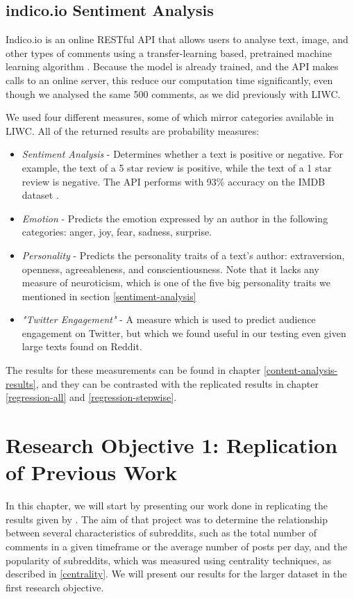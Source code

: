 \documentclass[bsc,frontabs,twoside,singlespacing,parskip,deptreport]{infthesis}
\begin{document}
\section{indico.io Sentiment Analysis}\label{indico}

Indico.io is an online RESTful API that allows users to analyse text, image, and other types of comments using a transfer-learning based, pretrained machine learning algorithm \cite{indico}. Because the model is already trained, and the API makes calls to an online server, this reduce our computation time significantly, even though we analysed the same 500 comments, as we did previously with LIWC.

We used four different measures, some of which mirror categories available in LIWC. All of the returned results are probability measures:

\begin{itemize}
	\item \textit{Sentiment Analysis} - Determines whether a text is positive or negative. For example, the text of a 5 star review is positive, while the text of a 1 star review is negative. The API performs with 93\% accuracy on the IMDB dataset \cite{indico}.
	\item \textit{Emotion} - Predicts the emotion expressed by an author in the following categories: anger, joy, fear, sadness, surprise.
	\item \textit{Personality} - Predicts the personality traits of a text's author: extraversion, openness, agreeableness, and conscientiousness. Note that it lacks any measure of neuroticism, which is one of the five big personality traits we mentioned in section \ref{sentiment-analysis}
	\item \textit{"Twitter Engagement"} - A measure which is used to predict audience engagement on Twitter, but which we found useful in our testing even given large texts found on Reddit.
\end{itemize}

The results for these measurements can be found in chapter \ref{content-analysis-results}, and they can be contrasted with the replicated results in chapter \ref{regression-all} and \ref{regression-stepwise}.

\chapter{Research Objective 1: Replication of Previous Work}\label{results}

In this chapter, we will start by presenting our work done in replicating the results given by \cite{masters}. The aim of that project was to determine the relationship between several characteristics of subreddits, such as the total number of comments in a given timeframe or the average number of posts per day, and the popularity of subreddits, which was measured using centrality techniques, as described in \ref{centrality}. We will present our results for the larger dataset in the first research objective.
\end{document}
